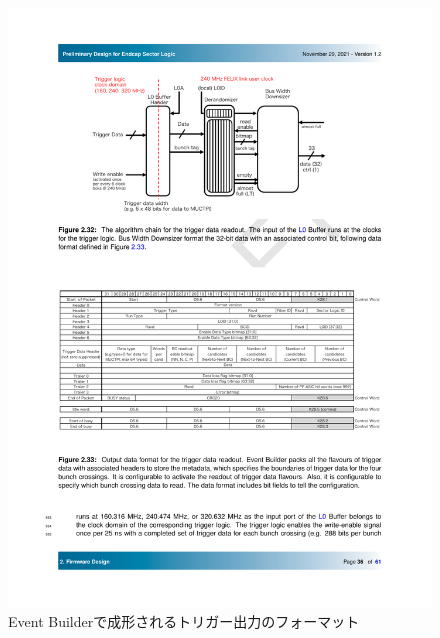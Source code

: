     \begin{figure} 
    \centering
    \includegraphics[width=16cm]{fig/Test/TriggerReadout_format.pdf}
    \caption[Event Builderで成形されるトリガー出力のフォーマット]{Event Builderで成形されるトリガー出力のフォーマット\cite{SLPDR}}
    \label{TriggerReadout_format}
    \end{figure}

